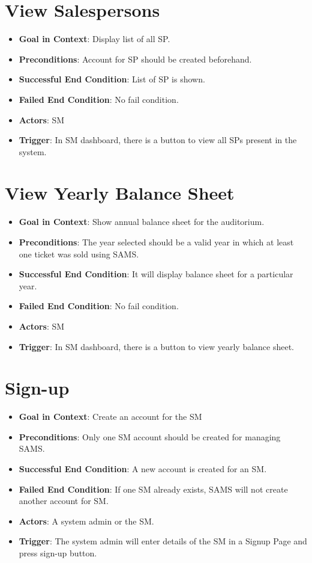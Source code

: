 \documentclass{scrreprt}
\begin{document}
\section{View Salespersons}
\begin{itemize}
\item \textbf{Goal in Context}: Display list of all SP.
\item \textbf{Preconditions}: Account for SP should be created beforehand.
\item \textbf{Successful End Condition}:  List of SP is shown.
\item \textbf{Failed End Condition}: No fail condition.
\item \textbf{Actors}: SM
\item \textbf{Trigger}: In SM dashboard, there is a button to view all SPs present in the system.
\end{itemize}


\section{View Yearly Balance Sheet}
\begin{itemize}
\item \textbf{Goal in Context}: Show annual balance sheet for the auditorium.
\item \textbf{Preconditions}: The year selected should be a valid year in which at least one ticket was sold using SAMS.  
\item \textbf{Successful End Condition}: It will display balance sheet for a particular year.
\item \textbf{Failed End Condition}: No fail condition.
\item \textbf{Actors}: SM
\item \textbf{Trigger}: In SM dashboard, there is a button to view  yearly balance sheet. 
\end{itemize}


\section{Sign-up}
\begin{itemize}
\item \textbf{Goal in Context}: Create an account for the SM
\item \textbf{Preconditions}: Only one SM account should be created for managing SAMS.
\item \textbf{Successful End Condition}: A new account is created for an SM. 
\item \textbf{Failed End Condition}: If one SM already exists, SAMS will not create another account for SM.
\item \textbf{Actors}: A system admin or the SM. 
\item \textbf{Trigger}: The system admin will enter details of the SM in a Signup Page and press sign-up button. 
\end{itemize}
\end{document}
